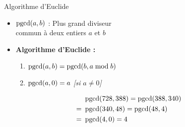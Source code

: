 \documentclass{main}
\begin{document}
\begin{frame}{Algorithme d’Euclide}
    \begin{minipage}{\dimexpr.7\textwidth-2em}
        \begin{itemize}
            \item \(\operatorname{pgcd}(a, b)\) : Plus grand diviseur\\commun à deux entiers \(a\) et \(b\)
            \item \textbf{Algorithme d’Euclide :}
            \begin{enumerate}
                \item \(\operatorname{pgcd}(a, b) = \operatorname{pgcd}(b, a\bmod b)\)
                \item \(\operatorname{pgcd}(a, 0) = a\) \quad \emph{[si \(a \neq 0\)]}
            \end{enumerate}
        \end{itemize}
        
        \vspace*{-2.25em}
        \begin{align*}
            &\operatorname{pgcd}(728, 388) = \operatorname{pgcd}(388, 340)\\
            =\ &\operatorname{pgcd}(340, 48) = \operatorname{pgcd}(48, 4)\\
            =\ & \operatorname{pgcd}(4, 0) = 4
        \end{align*}
        

\end{minipage}
\end{frame}
\end{document}
